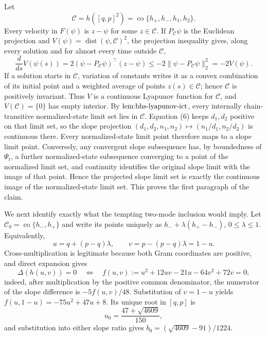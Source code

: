Let
\[
 \mathcal C=h([q,p]^2)=\operatorname{co}\{h_+,h_-,h_1,h_2\}.
\]
Every velocity in \(F(\psi)\) is \(z-\psi\) for some \(z\in\mathcal C\).  If \(P_{\mathcal C}\psi\) is the Euclidean projection and \(V(\psi)=\operatorname{dist}(\psi,\mathcal C)^2\), the projection inequality gives, along every solution and for almost every time outside \(\mathcal C\),
\[
 \frac{d}{ds}V(\psi(s))
 =2(\psi-P_{\mathcal C}\psi)^\top(z-\psi)
 \leq-2\|\psi-P_{\mathcal C}\psi\|_2^2=-2V(\psi). \tag{13}
\]
If a solution starts in \(\mathcal C\), variation of constants writes it as a convex combination of its initial point and a weighted average of points \(z(s)\in\mathcal C\); hence \(\mathcal C\) is positively invariant.  Thus \(V\) is a continuous Lyapunov function for \(\mathcal C\), and \(V(\mathcal C)=\{0\}\) has empty interior.  By \(\textnormal{lem:bhs-lyapunov-ict}\), every internally chain-transitive normalized-state limit set lies in \(\mathcal C\).  Equation (6) keeps \(d_1,d_2\) positive on that limit set, so the slope projection \((d_1,d_2,n_1,n_2)\mapsto(n_1/d_1,n_2/d_2)\) is continuous there.  Every normalized-state limit point therefore maps to a slope limit point.  Conversely, any convergent slope subsequence has, by boundedness of \(\Psi_t\), a further normalized-state subsequence converging to a point of the normalized limit set, and continuity identifies the original slope limit with the image of that point.  Hence the projected slope limit set is exactly the continuous image of the normalized-state limit set.  This proves the first paragraph of the claim.

We next identify exactly what the tempting two-mode inclusion would imply.  Let \(\mathcal C_0=\operatorname{co}\{h_-,h_+\}\) and write its points uniquely as \(h_-+\lambda(h_+-h_-)\), \(0\leq\lambda\leq1\).  Equivalently,
\[
 u=q+(p-q)\lambda,\qquad v=p-(p-q)\lambda=1-u. \tag{14}
\]
Cross-multiplication is legitimate because both Gram coordinates are positive, and direct expansion gives
\[
 \Delta(h(u,v))=0
 \quad\Longleftrightarrow\quad
 f(u,v):=u^2+12uv-21u-64v^2+72v=0; \tag{15}
\]
indeed, after multiplication by the positive common denominator, the numerator of the slope difference is \(-5f(u,v)/48\).  Substitution of \(v=1-u\) yields \(f(u,1-u)=-75u^2+47u+8\).  Its unique root in \([q,p]\) is
\[
 u_0=\frac{47+\sqrt{4609}}{150},
\]
and substitution into either slope ratio gives \(b_0=(\sqrt{4609}-91)/1224\).

